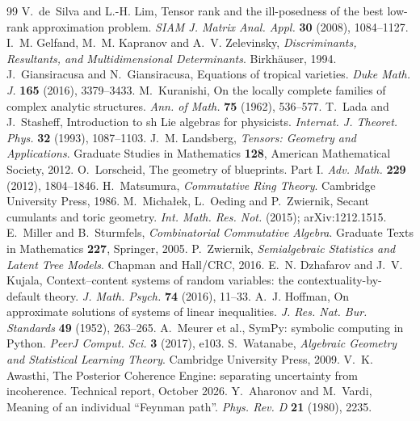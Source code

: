 \documentclass[11pt]{article}
\theoremstyle{definition}\newtheorem{definition}[theorem]{Definition}\newtheorem{remark}[theorem]{Remark}\newtheorem{example}[theorem]{Example}
\begin{document}
\begin{thebibliography}{99}
 V.~de~Silva and L.-H. Lim, Tensor rank and the ill-posedness of the best low-rank approximation problem.
  \emph{SIAM J. Matrix Anal. Appl.} \textbf{30} (2008), 1084--1127.
 I.~M. Gelfand, M.~M. Kapranov and A.~V. Zelevinsky, \emph{Discriminants, Resultants, and
  Multidimensional Determinants}. Birkh\"auser, 1994.
 J.~Giansiracusa and N.~Giansiracusa, Equations of tropical varieties. \emph{Duke Math. J.}
  \textbf{165} (2016), 3379--3433.
 M.~Kuranishi, On the locally complete families of complex analytic structures. \emph{Ann. of Math.}
  \textbf{75} (1962), 536--577.
 T.~Lada and J.~Stasheff, Introduction to sh Lie algebras for physicists. \emph{Internat. J. Theoret. Phys.}
  \textbf{32} (1993), 1087--1103.
 J.~M. Landsberg, \emph{Tensors: Geometry and Applications}. Graduate Studies in Mathematics \textbf{128},
  American Mathematical Society, 2012.
 O.~Lorscheid, The geometry of blueprints. Part I. \emph{Adv. Math.} \textbf{229} (2012), 1804--1846.
 H.~Matsumura, \emph{Commutative Ring Theory}. Cambridge University Press, 1986.
 M.~Michałek, L.~Oeding and P.~Zwiernik, Secant cumulants and toric geometry. \emph{Int. Math. Res.
  Not.} (2015); arXiv:1212.1515.
 E.~Miller and B.~Sturmfels, \emph{Combinatorial Commutative Algebra}. Graduate Texts in Mathematics
  \textbf{227}, Springer, 2005.
 P.~Zwiernik, \emph{Semialgebraic Statistics and Latent Tree Models}. Chapman and Hall/CRC, 2016.
 E.~N. Dzhafarov and J.~V. Kujala, Context--content systems of random variables: the
  contextuality-by-default theory. \emph{J. Math. Psych.} \textbf{74} (2016), 11--33.
 A.~J. Hoffman, On approximate solutions of systems of linear inequalities. \emph{J. Res. Nat. Bur. Standards}
  \textbf{49} (1952), 263--265.
 A.~Meurer et al., SymPy: symbolic computing in Python. \emph{PeerJ Comput. Sci.} \textbf{3} (2017), e103.
 S.~Watanabe, \emph{Algebraic Geometry and Statistical Learning Theory}. Cambridge University Press, 2009.
 V.~K. Awasthi, The Posterior Coherence Engine: separating uncertainty from incoherence. Technical report, October 2026.
 Y.~Aharonov and M.~Vardi, Meaning of an individual ``Feynman path''. \emph{Phys. Rev. D} \textbf{21} (1980), 2235.

\end{thebibliography}
\end{document}
